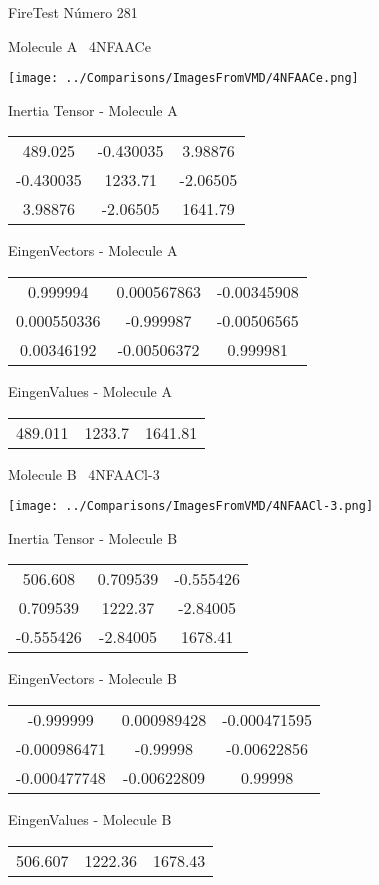 \vtab[-3cm]
\begin{center}
{\large FireTest \tab Número 281}
\end{center}
\begin{multicols}{2}
\begin{center}

Molecule A \
4NFAACe

\texttt{[image: ../Comparisons/ImagesFromVMD/4NFAACe.png]}

Inertia Tensor - Molecule A \\
\begin{tabular}{|c c c|}
489.025	 & 	-0.430035	 & 	3.98876	 \\
-0.430035	 & 	1233.71	 & 	-2.06505	 \\
3.98876	 & 	-2.06505	 & 	1641.79
\end{tabular}

\vtab
 EingenVectors - Molecule A     \\
\begin{tabular}{|c c c|}
0.999994	 & 	0.000567863	 & 	-0.00345908	 \\
0.000550336	 & 	-0.999987	 & 	-0.00506565	 \\
0.00346192	 & 	-0.00506372	 & 	0.999981
\end{tabular}

\vtab
 EingenValues - Molecule A     \\
\begin{tabular}{|c c c|}
489.011	 & 	1233.7	 & 	1641.81	 \\
\end{tabular}
\columnbreak

Molecule B \
4NFAACl-3

\texttt{[image: ../Comparisons/ImagesFromVMD/4NFAACl-3.png]}

Inertia Tensor - Molecule B \\
\begin{tabular}{|c c c|}
506.608	 & 	0.709539	 & 	-0.555426	 \\
0.709539	 & 	1222.37	 & 	-2.84005	 \\
-0.555426	 & 	-2.84005	 & 	1678.41
\end{tabular}

\vtab
 EingenVectors - Molecule B     \\
\begin{tabular}{|c c c|}
-0.999999	 & 	0.000989428	 & 	-0.000471595	 \\
-0.000986471	 & 	-0.99998	 & 	-0.00622856	 \\
-0.000477748	 & 	-0.00622809	 & 	0.99998
\end{tabular}

\vtab
 EingenValues - Molecule B     \\
\begin{tabular}{|c c c|}
506.607	 & 	1222.36	 & 	1678.43	 \\
\end{tabular}

\end{center}
\end{multicols}

